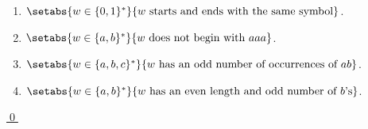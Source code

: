 \documentclass[11pt]{article}
\begin{document}
{\begin{uexercise}
\begin{enumerate}
\item\label{writerei} $\setabs{w\in \{0,1\}^*}{w\text{ starts and ends with the same symbol}}$.

\item\label{writerej} $\setabs{w\in \{a,b\}^*}{w \text{ does not begin with } aaa}$.

\item\label{writerek} $\setabs{w\in \{a,b,c\}^*}{w \text{ has an odd number of occurrences of } ab}$.

\item\label{writerel} $\setabs{w\in \{a,b\}^*}{w \text{ has an even length and odd number of
}b\text{'s}}$.
\end{enumerate}
	
\hyperlink{writeresol}{\qed}
\end{uexercise}

}

\appendix
\end{document}
